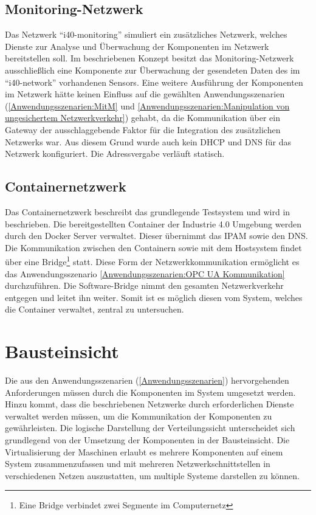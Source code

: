 \subsection{Monitoring-Netzwerk}
Das Netzwerk "`i40-monitoring"' simuliert ein zusätzliches Netzwerk, welches Dienste zur Analyse und Überwachung der Komponenten im Netzwerk bereitstellen soll. Im beschriebenen Konzept besitzt das Monitoring-Netzwerk ausschließlich eine Komponente zur Überwachung der gesendeten Daten des im "`i40-network"' vorhandenen Sensors. Eine weitere Ausführung der Komponenten im Netzwerk hätte keinen Einfluss auf die gewählten Anwendungsszenarien (\autoref{Anwendungsszenarien:MitM} und \autoref{Anwendungsszenarien:Manipulation von ungesichertem Netzwerkverkehr}) gehabt, da die Kommunikation über ein Gateway der ausschlaggebende Faktor für die Integration des zusätzlichen Netzwerks war. Aus diesem Grund wurde auch kein \ac{DHCP} und \ac{DNS} für das Netzwerk konfiguriert. Die Adressvergabe verläuft statisch.

\subsection{Containernetzwerk}
Das Containernetzwerk beschreibt das grundlegende Testsystem und wird in \cite{Weber2018} beschrieben. Die bereitgestellten Container der Industrie 4.0 Umgebung werden durch den Docker Server verwaltet. Dieser übernimmt das \ac{IPAM} sowie den \ac{DNS}. Die Kommunikation zwischen den Containern sowie mit dem Hostsystem findet über eine Bridge\footnote{Eine Bridge verbindet zwei Segmente im Computernetz} statt. Diese Form der Netzwerkkommunikation ermöglicht es das Anwendungsszenario \autoref{Anwendungsszenarien:OPC UA Kommunikation} durchzuführen. Die Software-Bridge nimmt den gesamten Netzwerkverkehr entgegen und leitet ihn weiter. Somit ist es möglich diesen vom System, welches die Container verwaltet, zentral zu untersuchen.

\section{Bausteinsicht}
Die aus den Anwendungsszenarien (\autoref{Anwendungsszenarien}) hervorgehenden Anforderungen müssen durch die Komponenten im System umgesetzt werden. Hinzu kommt, dass die beschriebenen Netzwerke durch erforderlichen Dienste verwaltet werden müssen, um die Kommunikation der Komponenten zu gewährleisten. Die logische Darstellung der Verteilungssicht unterscheidet sich grundlegend von der Umsetzung der Komponenten in der Bausteinsicht. Die Virtualisierung der Maschinen erlaubt es mehrere Komponenten auf einem System zusammenzufassen und mit mehreren Netzwerkschnittstellen in verschiedenen Netzen auszustatten, um multiple Systeme darstellen zu können.

